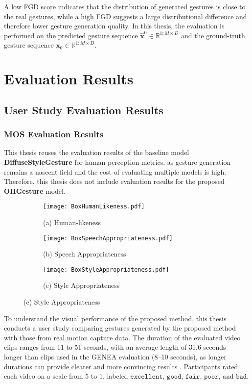 A low FGD score indicates that the distribution of generated gestures is close to the real gestures, while a high FGD suggests a large distributional difference and therefore lower gesture generation quality. In this thesis, the evaluation is performed on the predicted gesture sequence $\hat{\mathbf{x}}^{0} \in \mathbb{R}^{1:M \times D}$ and the ground-truth gesture sequence $\mathbf{x}_{0} \in \mathbb{R}^{1:M \times D}$.

\section{Evaluation Results}
\label{sec:result}

\subsection{User Study Evaluation Results}

\subsubsection{MOS Evaluation Results}

This thesis reuses the evaluation results of the baseline model \textbf{DiffuseStyleGesture} \cite{yang2023diffusestylegesture} for human perception metrics, as gesture generation remains a nascent field and the cost of evaluating multiple models is high. Therefore, this thesis does not include evaluation results for the proposed \textbf{OHGesture} model.

\begin{figure}[htbp]
	\centering
	\begin{subfigure}[b]{0.3\textwidth}
		\texttt{[image: BoxHumanLikeness.pdf]}
		\caption*{(a) Human-likeness}
	\end{subfigure}
	\hfill
	\begin{subfigure}[b]{0.3\textwidth}
		\texttt{[image: BoxSpeechAppropriateness.pdf]}
		\caption*{\small (b) Speech Appropriateness}
	\end{subfigure}
	\hfill
	\begin{subfigure}[b]{0.3\textwidth}
		\texttt{[image: BoxStyleAppropriateness.pdf]}
		\caption*{(c) Style Appropriateness}
	\end{subfigure}
	
	\label{fig:compare }
\end{figure}

To understand the visual performance of the proposed method, this thesis conducts a user study comparing gestures generated by the proposed method with those from real motion capture data. The duration of the evaluated video clips ranges from 11 to 51 seconds, with an average length of 31.6 seconds — longer than clips used in the GENEA evaluation \cite{yoon2022genea} (8–10 seconds), as longer durations can provide clearer and more convincing results \cite{yang2022reprgesture}. Participants rated each video on a scale from 5 to 1, labeled $\texttt{excellent}$, $\texttt{good}$, $\texttt{fair}$, $\texttt{poor}$, and $\texttt{bad}$. 


